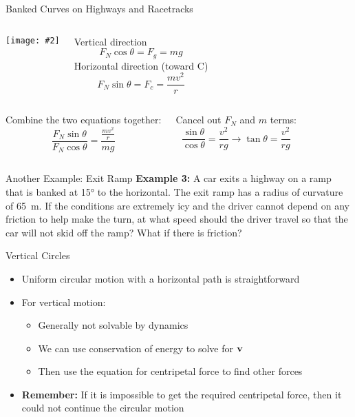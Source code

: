\documentclass[12pt,compress,aspectratio=169]{beamer}
\newcommand{\pic}[2]{\texttt{[image: \#2]}}
\newcommand{\mb}[1]{\ensuremath\mathbf{#1}}
\begin{document}
\begin{frame}{Banked Curves on Highways and Racetracks}
  \begin{columns}
    \pic{1}{banking.png}
    
    Vertical direction
    \begin{displaymath}
      F_N\cos\theta=F_g=mg
    \end{displaymath}
    Horizontal direction (toward C)
    \begin{displaymath}
      F_N\sin\theta=F_c=\frac{mv^2}{r}
    \end{displaymath}
  \end{columns}
  \pause
  \begin{columns}
    Combine the two equations together:
    \begin{displaymath}
      \frac{F_N\sin\theta}{F_N\cos\theta}=\frac{\frac{mv^2}{r}}{mg}
    \end{displaymath}
    
    Cancel out $F_N$ and $m$ terms:
    \begin{displaymath}
      \frac{\sin\theta}{\cos\theta}=\frac{v^2}{rg}\longrightarrow
      \boxed{\tan\theta=\frac{v^2}{rg}}
    \end{displaymath}
  \end{columns}
\end{frame}



\begin{frame}{Another Example: Exit Ramp}
  \textbf{Example 3:} A car exits a highway on a ramp that is banked at
  \ang{15} to the horizontal. The exit ramp has a radius of curvature of
  \SI{65}{\metre}. If the conditions are extremely icy and the driver cannot
  depend on any friction to help make the turn, at what speed should the driver
  travel so that the car will not skid off the ramp? What if there is friction?
\end{frame}



\begin{frame}{Vertical Circles}
  \begin{itemize}
  \item Uniform circular motion with a horizontal path is straightforward
  \item For vertical motion:
    \begin{itemize}
    \item Generally not solvable by dynamics
    \item We can use conservation of energy to solve for $\mb{v}$
    \item Then use the equation for centripetal force to find other forces
    \end{itemize}
  \item\textbf{Remember:} If it is impossible to get the required centripetal
    force, then it could not continue the circular motion
  \end{itemize}
\end{frame}
\end{document}
